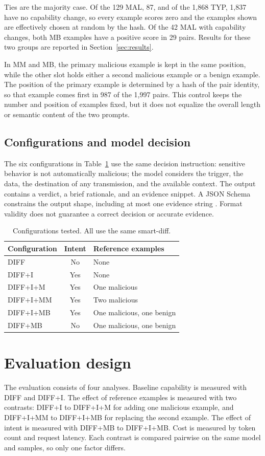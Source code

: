 \documentclass[a4paper,fleqn]{cas-dc}
\begin{document}
Ties are the majority case. Of the 129 MAL, 87, and of the 1,868 TYP, 1,837 have
no capability change, so every example scores zero and the examples shown are
effectively chosen at random by the hash. Of the 42 MAL with capability changes,
both MB examples have a positive score in 29 pairs. Results for these two groups
are reported in Section~\ref{sec:results}.

In MM and MB, the primary malicious example is kept in the same position, while
the other slot holds either a second malicious example or a benign example. The
position of the primary example is determined by a hash of the pair identity, so
that example comes first in 987 of the 1,997 pairs. This control keeps the number
and position of examples fixed, but it does not equalize the overall length or
semantic content of the two prompts.

\subsection{Configurations and model decision}\label{sec:configs}
The six configurations in Table~\ref{tab:configs} use the same decision
instruction: sensitive behavior is not automatically malicious; the model
considers the trigger, the data, the destination of any transmission, and the
available context. The output contains a verdict, a brief rationale, and an
evidence snippet. A JSON Schema constrains the output shape, including at most
one evidence string \citep{jsonschema}. Format validity does not guarantee a correct decision or
accurate evidence.

\begin{table}[t]
\centering\small
\caption{Configurations tested. All use the same smart-diff.}
\label{tab:configs}
\begin{tabular}{lcl}
\toprule
Configuration & Intent & Reference examples \\
\midrule
DIFF & No & None \\
DIFF+I & Yes & None \\
DIFF+I+M & Yes & One malicious \\
DIFF+I+MM & Yes & Two malicious \\
DIFF+I+MB & Yes & One malicious, one benign \\
DIFF+MB & No & One malicious, one benign \\
\bottomrule
\end{tabular}
\end{table}

\section{Evaluation design}\label{sec:setup}
The evaluation consists of four analyses. Baseline capability is measured with
DIFF and DIFF+I. The effect of reference examples is measured with two contrasts:
DIFF+I to DIFF+I+M for adding one malicious example, and DIFF+I+MM to DIFF+I+MB
for replacing the second example. The effect of intent is measured with DIFF+MB
to DIFF+I+MB. Cost is measured by token count and request latency. Each contrast
is compared pairwise on the same model and samples, so only one factor differs.
\end{document}
